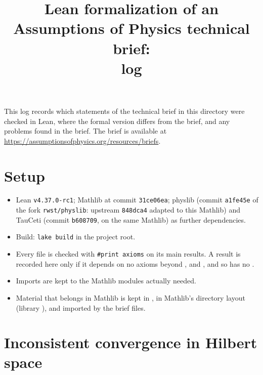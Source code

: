 \documentclass[11pt]{article}
\title{Lean formalization of an Assumptions of Physics technical brief:\\ log}
\author{}
\date{}
\begin{document}
\maketitle

\noindent
This log records which statements of the technical brief in this directory were checked in Lean,
where the formal version differs from the brief, and any problems found in the brief.
The brief is available at \url{https://assumptionsofphysics.org/resources/briefs}.

\section*{Setup}

\begin{itemize}
\item Lean \texttt{v4.37.0-rc1}; Mathlib at commit \texttt{31ce06ea}; physlib (commit \texttt{a1fe45e}
  of the fork \texttt{rwst/physlib}: upstream \texttt{848dca4} adapted to this Mathlib) and
  TauCeti (commit \texttt{b608709}, on the same Mathlib) as further dependencies.
\item Build: \texttt{lake build} in the project root.
\item Every file is checked with \texttt{\#print axioms} on its main results. A result is
  recorded here only if it depends on no axioms beyond ,
   and , and so has no .
\item Imports are kept to the Mathlib modules actually needed.
\item Material that belongs in Mathlib is kept in , in Mathlib's directory
  layout (library ), and imported by the brief files.
\end{itemize}



\section{Inconsistent convergence in Hilbert space}
\end{document}
